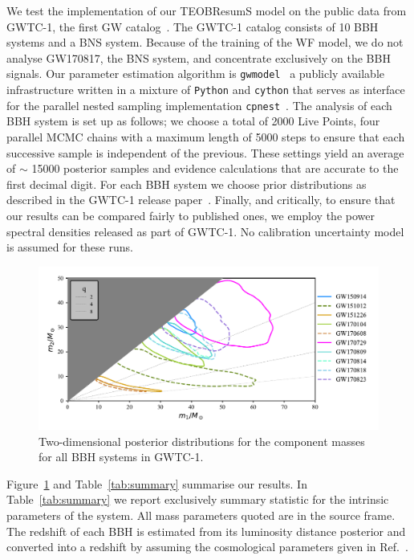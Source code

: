 We test the implementation of our TEOBResumS model on the public data from GWTC-1, the first GW catalog~\cite{}. 
The GWTC-1 catalog consists of 10 BBH systems and a BNS system. Because of the training of the WF model, we do not analyse GW170817, the BNS system, and concentrate exclusively on the BBH signals. Our parameter estimation algorithm is \texttt{gwmodel}~\cite{} a publicly available infrastructure 
written in a mixture of \texttt{Python} and \texttt{cython} that serves as interface for the parallel nested sampling implementation \texttt{cpnest}~\cite{}. 
The analysis of each BBH system is set up as follows; we choose a total of 2000 Live Points, four parallel MCMC chains with a maximum length of 5000 steps to ensure that each successive sample is independent of the previous. These settings yield an average of $\sim$ 15000 posterior samples and 
evidence calculations that are accurate to the first decimal digit. For each BBH system we choose prior distributions as described in the GWTC-1 release paper~\cite{}. Finally, and critically, to ensure that our results can be compared fairly to published ones, we employ the power spectral densities released as part of GWTC-1. No calibration uncertainty model is assumed for these runs. 
\begin{figure}
	\centering
    \includegraphics[width=.75\linewidth, trim = {3cm 0cm 3cm 0cm}]{img/posterior_masses_source.pdf}
	\caption{
Two-dimensional posterior distributions for the component masses for all BBH systems in GWTC-1.
}
	\label{fig:summary-masses}
\end{figure}

Figure~\ref{fig:summary-masses} and Table~\ref{tab:summary} summarise our results. In Table~\ref{tab:summary} we report exclusively 
summary statistic for the intrinsic parameters of the system. All mass parameters quoted are in the source frame. The redshift of each BBH is estimated 
from its luminosity distance posterior and converted into a redshift by assuming the cosmological parameters given in Ref.~\cite{}.

